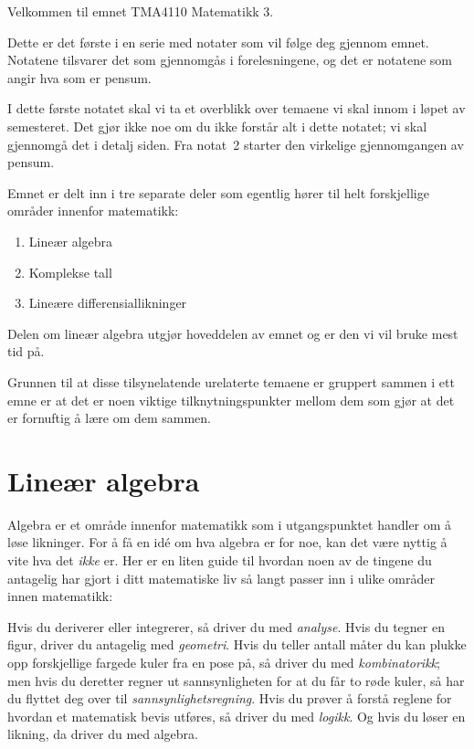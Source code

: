 
\usepackage{tikz}
\usetikzlibrary{arrows.meta}




\noindent%
Velkommen til emnet TMA4110 Matematikk 3.

Dette er det første i en serie med notater som vil følge deg gjennom
emnet.  Notatene tilsvarer det som gjennomgås i forelesningene, og det
er notatene som angir hva som er pensum.

I dette første notatet skal vi ta et overblikk over temaene vi skal
innom i løpet av semesteret.  Det gjør ikke noe om du ikke forstår alt
i dette notatet; vi skal gjennomgå det i detalj siden.  Fra notat~2
starter den virkelige gjennomgangen av pensum.

\smallskip

Emnet er delt inn i tre separate deler som egentlig hører til helt
forskjellige områder innenfor matematikk:
\begin{enumerate}
\item Lineær algebra
\item Komplekse tall
\item Lineære differensiallikninger
\end{enumerate}
Delen om lineær algebra utgjør hoveddelen av emnet og er den vi vil
bruke mest tid på.

\smallskip

Grunnen til at disse tilsynelatende urelaterte temaene er gruppert
sammen i ett emne er at det er noen viktige tilknytningspunkter mellom
dem som gjør at det er fornuftig å lære om dem sammen.


\section*{Lineær algebra}

Algebra er et område innenfor matematikk som i utgangspunktet handler
om å løse likninger.  For å få en idé om hva algebra er for noe, kan
det være nyttig å vite hva det \emph{ikke} er.  Her er en liten guide
til hvordan noen av de tingene du antagelig har gjort i ditt
matematiske liv så langt passer inn i ulike områder innen matematikk:

Hvis du deriverer eller integrerer, så driver du med \emph{analyse}.
Hvis du tegner en figur, driver du antagelig med \emph{geometri}.
Hvis du teller antall måter du kan plukke opp forskjellige fargede
kuler fra en pose på, så driver du med \emph{kombinatorikk}; men hvis
du deretter regner ut sannsynligheten for at du får to røde kuler, så
har du flyttet deg over til \emph{sannsynlighetsregning}.  Hvis du
prøver å forstå reglene for hvordan et matematisk bevis utføres, så
driver du med \emph{logikk}.  Og hvis du løser en likning, da driver
du med algebra.

